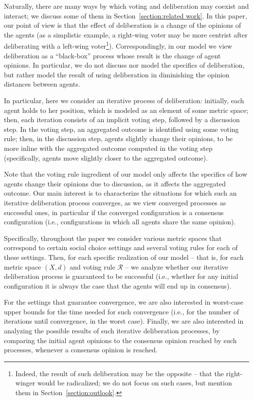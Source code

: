 \documentclass[runningheads,envcountsame]{llncs}
\begin{document}
Naturally, there are many ways by which voting and deliberation may coexist and interact; we discuss some of them in Section~\ref{section:related work}. In this paper, our point of view is that the effect of deliberation is a change of the opinions of the agents (as a simplistic example, a right-wing voter may be more centrist after deliberating with a left-wing voter\footnote{Indeed, the result of such deliberation may be the opposite -- that the right-winger would be radicalized; we do not focus on such cases, but mention them in Section~\ref{section:outlook}.}).
%
Correspondingly, in our model we view deliberation as a ``black-box'' process whose result is the change of agent opinions. In particular, we do not discuss nor model the specifics of deliberation, but rather model the result of using deliberation in diminishing the opinion distances between agents.

In particular, here we consider an iterative process of deliberation:
  initially, each agent holds to her position, which is modeled as an element of some metric space; then, each iteration consists of an implicit voting step, followed by a discussion step.
  In the voting step, an aggregated outcome is identified using some voting rule; then, in the discussion step, agents slightly change their opinions, to be more inline with the aggregated outcome computed in the voting step (specifically, agents move slightly closer to the aggregated outcome).

Note that the voting rule ingredient of our model only affects the specifics of how agents change their opinions due to discussion, as it affects the aggregated outcome.
%
Our main interest is to characterize the situations for which such an iterative deliberation process converges, as we view converged processes as successful ones, in particular if the converged configuration is a consensus configuration (i.e., configurations in which all agents share the same opinion).

Specifically, throughout the paper we consider various metric spaces that correspond to certain social choice settings and several voting rules for each of these settings. Then, for each specific realization of our model -- that is, for each metric space $(X, d)$ and voting rule $\mathcal{R}$ -- we analyze whether our iterative deliberation process is guaranteed to be successful (i.e., whether for any initial configuration it is always the case that the agents will end up in consensus).

For the settings that guarantee convergence, we are also interested in worst-case upper bounds for the time needed for such convergence (i.e., for the number of iterations until convergence, in the worst case).
%
Finally, we are also interested in analyzing the possible results of such iterative deliberation processes, by comparing the initial agent opinions to the consensus opinion reached by such processes, whenever a consensus opinion is reached. 
\end{document}
